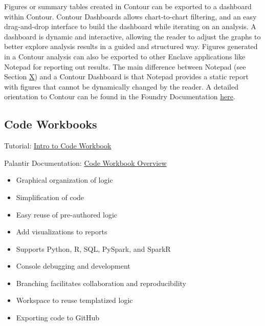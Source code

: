 \documentclass[
  letterpaper,
  DIV=11,
  numbers=noendperiod]{scrreprt}
\providecommand{\tightlist}{%
  \setlength{\itemsep}{0pt}\setlength{\parskip}{0pt}}\usepackage{longtable,booktabs,array}
\begin{document}
Figures or summary tables created in Contour can be exported to a
dashboard within Contour. Contour Dashboards allows chart-to-chart
filtering, and an easy drag-and-drop interface to build the dashboard
while iterating on an analysis. A dashboard is dynamic and interactive,
allowing the reader to adjust the graphs to better explore analysis
results in a guided and structured way. Figures generated in a Contour
analysis can also be exported to other Enclave applications like Notepad
for reporting out results. The main difference between Notepad (see
Section \protect\hyperlink{Notepad}{X}) and a Contour Dashboard is that
Notepad provides a static report with figures that cannot be dynamically
changed by the reader. A detailed orientation to Contour can be found in
the Foundry Documentation
\href{https://www.palantir.com/docs/foundry/contour/overview/}{here}.

\hypertarget{code-workbooks}{%
\subsection{Code Workbooks}\label{code-workbooks}}

Tutorial:
\href{https://unite.nih.gov/workspace/module/view/latest/ri.workshop.main.module.e7b83a8c-545e-49ac-8714-f34bfa7f7767?view=focus\&Id=22}{Intro
to Code Workbook}

Palantir Documentation:
\href{https://www.palantir.com/docs/foundry/code-workbook/overview/}{Code
Workbook Overview}

\begin{itemize}
\tightlist
\item
  Graphical organization of logic
\item
  Simplification of code
\item
  Easy reuse of pre-authored logic
\item
  Add visualizations to reports
\item
  Supports Python, R, SQL, PySpark, and SparkR
\item
  Console debugging and development
\item
  Branching facilitates collaboration and reproducibility
\item
  Workspace to reuse templatized logic
\item
  Exporting code to GitHub
\end{itemize}
\end{document}
